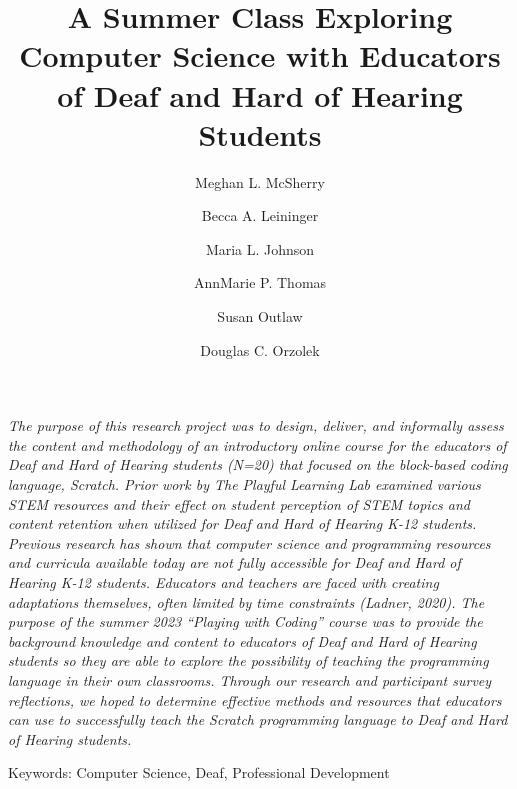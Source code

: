 \documentclass[11.5pt]{sig-alternate} %
\makeatletter
\let\oldabstract\abstract
\let\oldendabstract\endabstract
\renewenvironment{abstract} %
{\renewenvironment{quotation}%
               {\list{}{\addtolength{\leftmargin}{1em} %
                        \listparindent 1.5em%
                        \itemindent    \listparindent%
                        \rightmargin   \leftmargin%
                        \parsep        \z@ \@plus\p@}%
                \item\relax}%
               {\endlist}%
\oldabstract}
{\oldendabstract}
\makeatother
\begin{document}
\title{A Summer Class Exploring Computer Science with Educators of Deaf and Hard of Hearing Students}

\author[1]{\large \color{blue} Meghan L. McSherry} %
\author[1]{\large \color{blue} Becca A. Leininger}
\author[1]{\large \color{blue} Maria L. Johnson}
\author[1]{\large \color{blue} AnnMarie P. Thomas}
\author[2]{\large \color{blue} Susan Outlaw}
\author[1]{\large \color{blue} Douglas C. Orzolek}

\toappear{} %

\maketitle %
\begin{@twocolumnfalse} 
\begin{abstract}
\item %
\begin{large}
\textit{The purpose of this research project was to design, deliver, and informally assess the content and methodology of an introductory online course for the educators of Deaf and Hard of Hearing students (N=20) that focused on the block-based coding language, Scratch. Prior work by The Playful Learning Lab examined various STEM resources and their effect on student perception of STEM topics and content retention when utilized for Deaf and Hard of Hearing K-12 students. Previous research has shown that computer science and programming resources and curricula available today are not fully accessible for Deaf and Hard of Hearing K-12 students. Educators and teachers are faced with creating adaptations themselves, often limited by time constraints (Ladner, 2020). The purpose of the summer 2023 “Playing with Coding” course was to provide the background knowledge and content to educators of Deaf and Hard of Hearing students so they are able to explore the possibility of teaching the programming language in their own classrooms. Through our research and participant survey reflections, we hoped to determine effective methods and resources that educators can use to successfully teach the Scratch programming language to Deaf and Hard of Hearing students.}

\item Keywords: Computer Science, Deaf, Professional Development
\end{large}     
\end{abstract}
\end{@twocolumnfalse}
\end{document}
